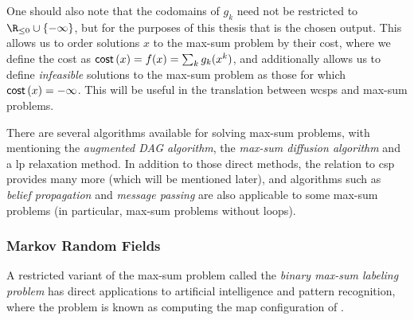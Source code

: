 One should also note that the codomains of \(g_k\) need not be restricted to \(\Rminus \cup \{-\infty\}\), but for the purposes of this thesis that is the chosen output.
This allows us to order solutions \(x\) to the max-sum problem by their cost, where we define the cost as \(\operatorname{\mathsf{cost}}\left(x\right) = f(x) = \sum_k g_k(x^k)\), and additionally allows us to define \emph{infeasible} solutions to the max-sum problem as those for which \(\operatorname{\mathsf{cost}}\left(x\right) = -\infty\).
This will be useful in the translation between \glspl{wcsp} and max-sum problems.


There are several algorithms available for solving max-sum problems, with \textcite{Werner07} mentioning the \emph{augmented DAG algorithm}, the \emph{max-sum diffusion algorithm} and a \gls{lp} relaxation method.
In addition to those direct methods, the relation to \gls{csp} provides many more (which will be mentioned later), and algorithms such as \emph{belief propagation} and \emph{message passing} are also applicable to some max-sum problems (in particular, max-sum problems without loops).


\subsubsection{Markov Random Fields}
A restricted variant of the max-sum problem called the \emph{binary max-sum labeling problem} has direct applications to artificial intelligence and pattern recognition, where the problem is known as computing the \gls{map} configuration of  \parencite[\pno~1165]{Werner07}.


